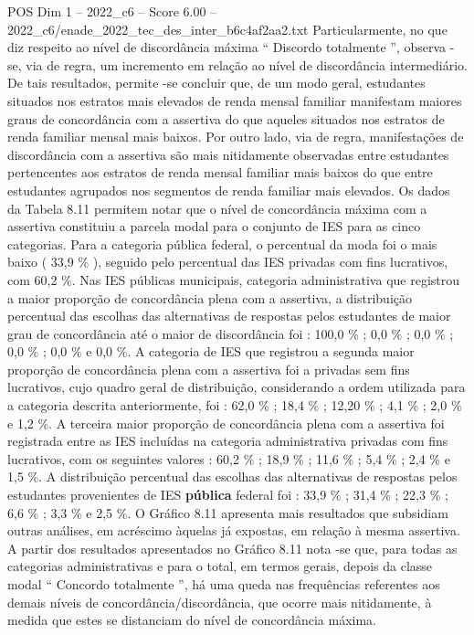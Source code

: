 \begin{textsample}{POS Dim 1 – 2022\_c6 – Score 6.00 – 2022\_c6/enade\_2022\_tec\_des\_inter\_b6c4af2aa2.txt}
Particularmente, no que diz respeito ao nível de discordância máxima “ Discordo totalmente ”, observa -se, via de regra, um incremento em relação ao nível de discordância intermediário.
De tais resultados, permite -se concluir que, de um modo geral, estudantes situados nos estratos mais elevados de renda mensal familiar manifestam maiores graus de concordância com a assertiva do que aqueles situados nos estratos de renda familiar mensal mais baixos.
Por outro lado, via de regra, manifestações de discordância com a assertiva são mais nitidamente observadas entre estudantes pertencentes aos estratos de renda mensal familiar mais baixos do que entre estudantes agrupados nos segmentos de renda familiar mais elevados.
Os dados da Tabela 8.11 permitem notar que o nível de concordância máxima com a assertiva constituiu a parcela modal para o conjunto de IES para as cinco categorias.
Para a categoria pública federal, o percentual da moda foi o mais baixo ( 33,9 \% ), seguido pelo percentual das IES privadas com fins lucrativos, com 60,2 \%.
Nas IES públicas municipais, categoria administrativa que registrou a maior proporção de concordância plena com a assertiva, a distribuição percentual das escolhas das alternativas de respostas pelos estudantes de maior grau de concordância até o maior de discordância foi : 100,0 \% ; 0,0 \% ; 0,0 \% ; 0,0 \% ; 0,0 \% e 0,0 \%.
A categoria de IES que registrou a segunda maior proporção de concordância plena com a assertiva foi a privadas sem fins lucrativos, cujo quadro geral de distribuição, considerando a ordem utilizada para a categoria descrita anteriormente, foi : 62,0 \% ; 18,4 \% ; 12,20 \% ; 4,1 \% ; 2,0 \% e 1,2 \%.
A terceira maior proporção de concordância plena com a assertiva foi registrada entre as IES incluídas na categoria administrativa privadas com fins lucrativos, com os seguintes valores : 60,2 \% ; 18,9 \% ; 11,6 \% ; 5,4 \% ; 2,4 \% e 1,5 \%.
A distribuição percentual das escolhas das alternativas de respostas pelos estudantes provenientes de IES \textbf{pública} federal foi : 33,9 \% ; 31,4 \% ; 22,3 \% ; 6,6 \% ; 3,3 \% e 2,5 \%.
O Gráfico 8.11 apresenta mais resultados que subsidiam outras análises, em acréscimo àquelas já expostas, em relação à mesma assertiva.
A partir dos resultados apresentados no Gráfico 8.11 nota -se que, para todas as categorias administrativas e para o total, em termos gerais, depois da classe modal “ Concordo totalmente ”, há uma queda nas frequências referentes aos demais níveis de concordância/discordância, que ocorre mais nitidamente, à medida que estes se distanciam do nível de concordância máxima.

\end{textsample}
